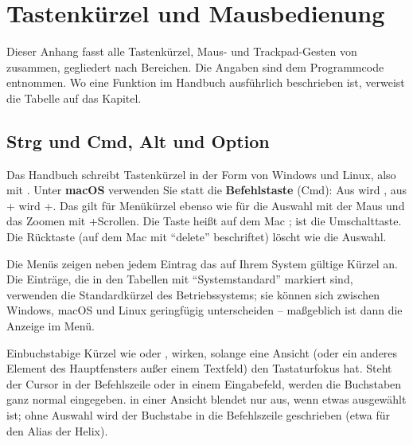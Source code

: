 \chapter{Tastenkürzel und Mausbedienung}\label{kap:tastenkuerzel}
\sloppy %

Dieser Anhang fasst alle Tastenkürzel, Maus- und Trackpad-Gesten von \produkt{} zusammen,
gegliedert nach Bereichen. Die Angaben sind dem Programmcode entnommen. Wo eine Funktion im
Handbuch ausführlich beschrieben ist, verweist die Tabelle auf das Kapitel.

\section{Strg und Cmd, Alt und Option}\label{sec:strg-cmd}

Das Handbuch schreibt Tastenkürzel in der Form von Windows und Linux, also mit .
Unter \textbf{macOS} verwenden Sie statt  die \textbf{Befehlstaste} (Cmd): Aus
 wird , aus + wird +. Das
gilt für Menükürzel ebenso wie für die Auswahl mit der Maus und das Zoomen mit
+Scrollen. Die Taste  heißt auf dem Mac ;  ist die
Umschalttaste. Die Rücktaste (auf dem Mac mit \enquote{delete} beschriftet) löscht wie
 die Auswahl.

Die Menüs zeigen neben jedem Eintrag das auf Ihrem System gültige Kürzel an. Die Einträge, die
in den Tabellen mit \enquote{Systemstandard} markiert sind, verwenden die Standardkürzel des
Betriebssystems; sie können sich zwischen Windows, macOS und Linux geringfügig unterscheiden --
maßgeblich ist dann die Anzeige im Menü.

\begin{hinweis}
Einbuchstabige Kürzel wie  oder ,  wirken, solange eine Ansicht (oder
ein anderes Element des Hauptfensters außer einem Textfeld) den Tastaturfokus hat. Steht der
Cursor in der Befehlszeile oder in einem Eingabefeld, werden die Buchstaben ganz normal
eingegeben.  in einer Ansicht blendet nur aus, wenn etwas ausgewählt ist; ohne Auswahl
wird der Buchstabe in die Befehlszeile geschrieben (etwa für den Alias  der Helix).
\end{hinweis}

